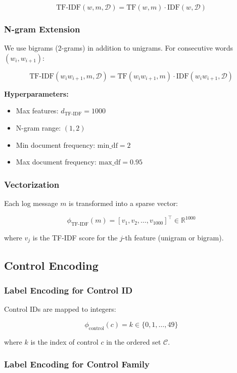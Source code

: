 \documentclass[12pt,a4paper]{article}
\begin{document}
$$\text{TF-IDF}(w, m, \mathcal{D}) = \text{TF}(w, m) \cdot \text{IDF}(w, \mathcal{D})$$

\subsubsection{N-gram Extension}

We use bigrams (2-grams) in addition to unigrams. For consecutive words $(w_i, w_{i+1})$:

$$\text{TF-IDF}(w_i w_{i+1}, m, \mathcal{D}) = \text{TF}(w_i w_{i+1}, m) \cdot \text{IDF}(w_i w_{i+1}, \mathcal{D})$$

\textbf{Hyperparameters:}
\begin{itemize}
    \item Max features: $d_{\text{TF-IDF}} = 1000$
    \item N-gram range: $(1, 2)$
    \item Min document frequency: $\text{min\_df} = 2$
    \item Max document frequency: $\text{max\_df} = 0.95$
\end{itemize}

\subsubsection{Vectorization}

Each log message $m$ is transformed into a sparse vector:

$$\phi_{\text{TF-IDF}}(m) = [v_1, v_2, \ldots, v_{1000}]^\top \in \mathbb{R}^{1000}$$

where $v_j$ is the TF-IDF score for the $j$-th feature (unigram or bigram).

\subsection{Control Encoding}

\subsubsection{Label Encoding for Control ID}

Control IDs are mapped to integers:

$$\phi_{\text{control}}(c) = k \in \{0, 1, \ldots, 49\}$$

where $k$ is the index of control $c$ in the ordered set $\mathcal{C}$.

\subsubsection{Label Encoding for Control Family}
\end{document}
